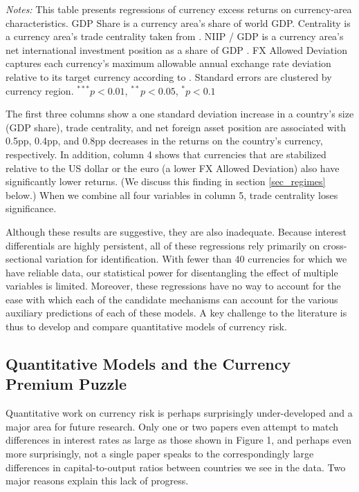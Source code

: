 \documentclass{ar-1col}
\begin{document}
\begin{table}[htp]
\begin{minipage}[htp!]{\textwidth}
\scriptsize
\emph{Notes:} This table presents regressions of currency excess returns on currency-area characteristics. GDP Share is a currency area's share of world GDP. Centrality is a currency area's trade centrality taken from \citet{Richmond2019}. NIIP / GDP is a currency area's net international investment position as a share of GDP \citep{DellaCorteetal2016}. FX Allowed Deviation captures each currency's maximum allowable annual exchange rate deviation relative to its target currency according to \citet{ilzetzki2018exchange}. Standard errors are clustered by currency region. $^{***}p<0.01$, $^{**}p<0.05$, $^*p<0.1$
\end{minipage}
\end{table}

The first three columns show a one standard deviation increase in a country's size (GDP share), trade centrality, and net foreign asset position are associated with 0.5pp, 0.4pp, and 0.8pp decreases in the returns on the country's currency, respectively. In addition, column 4 shows that currencies that are stabilized relative to the US dollar or the euro (a lower FX Allowed Deviation) also have significantly lower returns. (We discuss this finding in section \ref{sec_regimes} below.) When we combine all four variables in column 5, trade centrality loses significance.

Although these results are suggestive, they are also inadequate. Because interest differentials are highly persistent, all of these regressions rely primarily on cross-sectional variation for identification.  With fewer than 40 currencies for which we have reliable data, our statistical power for disentangling the effect of multiple variables is limited. Moreover, these regressions have no way to account for the ease with which each of the candidate mechanisms can account for the various auxiliary predictions of each of these models. A key challenge to the literature is thus to develop and compare quantitative models of currency risk.


\subsection{Quantitative Models and the Currency Premium Puzzle \label{section:cpp}}

Quantitative work on currency risk is perhaps surprisingly under-developed and a major area for future research. Only one or two papers even attempt to match differences in interest rates as large as those shown in Figure 1, and perhaps even more surprisingly, not a single paper speaks to the correspondingly large differences in capital-to-output ratios between countries we see in the data. Two major reasons explain this lack of progress.
\end{document}
